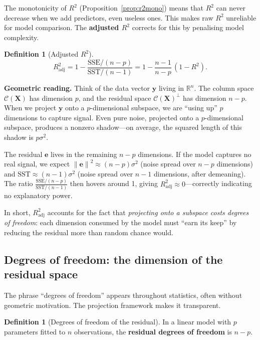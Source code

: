\documentclass[11pt,a4paper]{article}
\theoremstyle{plain}
\theoremstyle{definition}
\newtheorem{definition}[theorem]{Definition}
\newcommand{\R}{\mathbb{R}}
\newcommand{\bX}{\bm{X}}
\newcommand{\by}{\bm{y}}
\newcommand{\be}{\bm{e}}
\newcommand{\Col}{\mathcal{C}}
\newcommand{\norm}[1]{\left\lVert #1 \right\rVert}
\begin{document}
The monotonicity of $R^2$ (Proposition~\ref{prop:r2mono}) means that
$R^2$ can never decrease when we add predictors, even useless ones.
This makes raw $R^2$ unreliable for model comparison.
The \textbf{adjusted $R^2$} corrects for this by penalising model complexity.

\begin{definition}[Adjusted $R^2$]
\[
  R^2_{\text{adj}}
  = 1 - \frac{\text{SSE}/(n-p)}{\text{SST}/(n-1)}
  = 1 - \frac{n-1}{n-p}\,(1-R^2).
\]
\end{definition}

\noindent\textbf{Geometric reading.}
Think of the data vector $\by$ living in $\R^n$.
The column space $\Col(\bX)$ has dimension $p$, and the residual space
$\Col(\bX)^\perp$ has dimension $n - p$.
When we project $\by$ onto a $p$-dimensional subspace, we are ``using up''
$p$ dimensions to capture signal.  Even pure noise, projected onto a
$p$-dimensional subspace, produces a nonzero shadow---on average, the
squared length of this shadow is $p\sigma^2$.

The residual $\be$ lives in the remaining $n-p$ dimensions.
If the model captures no real signal, we expect
$\norm{\be}^2 \approx (n-p)\sigma^2$ (noise spread over $n-p$ dimensions)
and $\text{SST} \approx (n-1)\sigma^2$ (noise spread over $n-1$ dimensions,
after demeaning).
The ratio $\frac{\text{SSE}/(n-p)}{\text{SST}/(n-1)}$ then hovers around 1,
giving $R^2_{\text{adj}} \approx 0$---correctly indicating no explanatory power.

In short, $R^2_{\text{adj}}$ accounts for the fact that \emph{projecting onto
a subspace costs degrees of freedom}: each dimension consumed by the model
must ``earn its keep'' by reducing the residual more than random chance would.

\subsection{Degrees of freedom: the dimension of the residual space}\label{sec:df}

The phrase ``degrees of freedom'' appears throughout statistics, often without
geometric motivation.  The projection framework makes it transparent.

\begin{definition}[Degrees of freedom of the residual]
In a linear model with $p$ parameters fitted to $n$ observations, the
\textbf{residual degrees of freedom} is $n - p$.
\end{definition}
\end{document}
